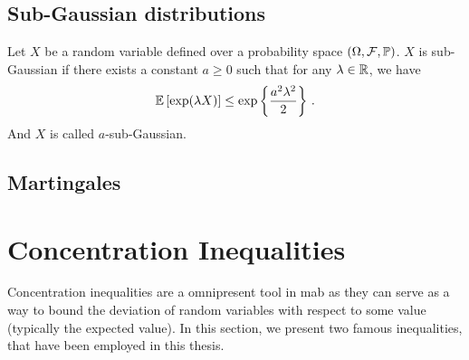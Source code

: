 
\subsection{Sub-Gaussian distributions}\label{app:maths.proba.subgaussian}

\begin{definition}
\begin{leftbar}[defnbar]
Let $X$ be a random variable defined over a probability space $(\Omega,\mathcal{F},\mathbb{P})$. $X$ is sub-Gaussian if there exists a constant $a\geq 0$ such that for any $\lambda\in\mathbb{R}$, we have
\[
    \mathbb{E}\left[\exp(\lambda X)\right] \leq \exp\left\{\frac{a^2\lambda^2}{2}\right\}\,.
\]
And $X$ is called $a$-sub-Gaussian.
\end{leftbar}
\end{definition}


\subsection{Martingales}\label{app:maths.proba.martingale}

\section{Concentration Inequalities}\label{app:maths.concentration}

Concentration inequalities are a omnipresent tool in \gls{mab} as they can serve as a way to bound the deviation of random variables with respect to some value (typically the expected value). In this section, we present two famous inequalities, that have been employed in this thesis.

